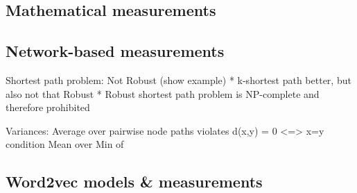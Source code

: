 \documentclass{thesisclass}
\begin{document}
\subsection{Mathematical measurements}

\subsection{Network-based measurements}

Shortest path problem:
Not Robust (show example)
* k-shortest path better, but also not that Robust
* Robust shortest path problem is NP-complete and therefore prohibited


Variances:
Average over pairwise node paths violates d(x,y) = 0 <=> x=y condition
Mean over Min of 

\subsection{Word2vec models \& measurements}

\end{document}
